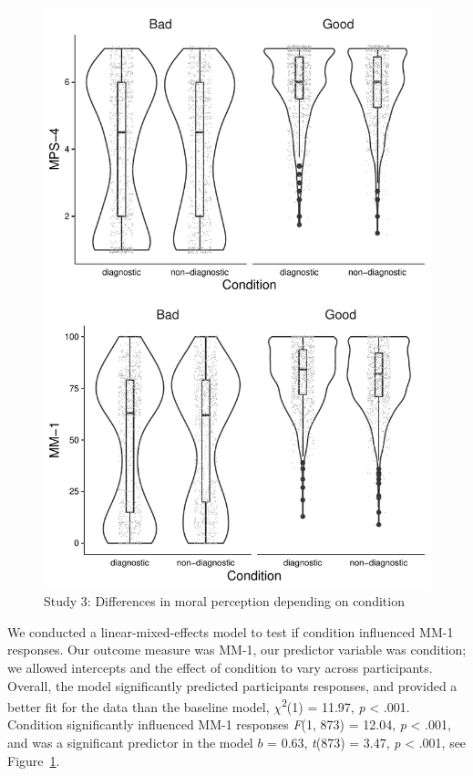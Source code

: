 \documentclass[
  american,
  man,floatsintext]{apa7}
\begin{document}
\begin{figure}

\includegraphics{Study_3_files/figure-latex/S3bothconditionplot-1} \hfill{}

\caption{Study 3: Differences in moral perception depending on condition}\label{fig:S3bothconditionplot}
\end{figure}

We conducted a linear-mixed-effects model to test if condition influenced MM-1 responses. Our outcome measure was MM-1, our predictor variable was condition; we allowed intercepts and the effect of condition to vary across participants. Overall, the model significantly predicted participants responses, and provided a better fit for the data than the baseline model, \(\chi\)\textsuperscript{2}(1) = 11.97, \emph{p} \textless{} .001. Condition significantly influenced MM-1 responses \emph{F}(1, 873) = 12.04, \emph{p} \textless{} .001, and was a significant predictor in the model \(b\) = 0.63, \emph{t}(873) = 3.47, \emph{p} \textless{} .001, see Figure~\ref{fig:S3bothconditionplot}.
\end{document}
